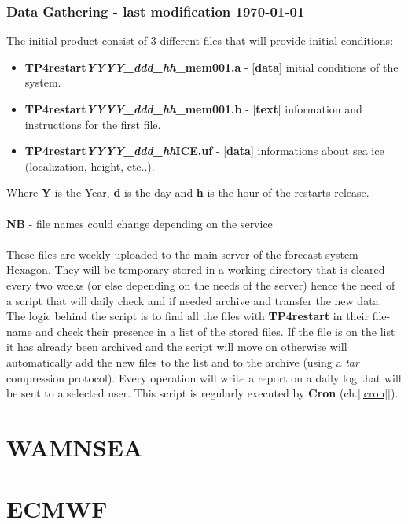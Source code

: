 \documentclass[12pt,a4paper]{report}
\begin{document}
\subsection{Data Gathering - last modification \today}
The initial product consist of 3 different files that will provide initial conditions: \\
\begin{itemize}
\item \textbf{TP4restart\textit{YYYY\_ddd\_hh}\_mem001.a} - [\textbf{data}] initial conditions of the system.
\item \textbf{TP4restart\textit{YYYY\_ddd\_hh}\_mem001.b} - [\textbf{text}] information and instructions for the first file.
\item \textbf{TP4restart\textit{YYYY\_ddd\_hh}ICE.uf} - [\textbf{data}] informations about sea ice (localization, height, etc..).
\end{itemize}
Where \textbf{Y} is the Year, \textbf{d} is the day and \textbf{h} is the hour of the restarts release. \\ \\
\textbf{NB} - file names could change depending on the service \\ \\
These files are weekly uploaded to the main server of the forecast system Hexagon. They will be temporary stored in a working directory that is cleared every two weeks (or else depending on the needs of the server) hence the need of a script that will daily check and if needed archive and transfer the new data. \\
The logic behind the script is to find all the files with \textbf{TP4restart} in their file-name and check their presence in a list of the stored files. If the file is on the list it has already been archived and the script will move on otherwise will automatically add the new files to the list and to the archive (using a \textit{tar} compression protocol). Every operation will write a report on a daily log that will be sent to a selected user. This script is regularly executed by \textbf{Cron} (ch.[\ref{cron}]).
\chapter{WAMNSEA}

\chapter{ECMWF}

%
%
%

\end{document}
